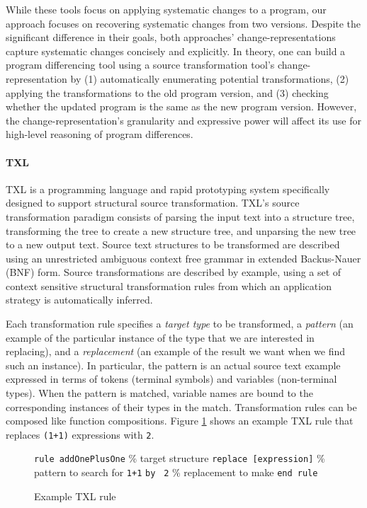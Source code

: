 \documentclass[runningheads,a4paper]{llncs}
\newcommand{\codefont}[1]{\footnotesize{\texttt{#1}}\normalsize}
\begin{document}
While these tools focus on applying systematic changes to a program, our approach focuses on recovering systematic changes from two versions. 
Despite the significant difference in their goals, both approaches' change-representations capture systematic changes concisely and explicitly. In theory, one can build a program differencing tool using a source transformation tool's change-representation by (1) automatically enumerating potential transformations, (2) applying the transformations to the old program version, and (3) checking whether the updated program is the same as the new program version. 
However, the change-representation's granularity and expressive power will affect its use for high-level reasoning of program differences. 

\paragraph{TXL} 

TXL is a programming language and rapid prototyping system specifically designed to support structural source transformation. TXL's source transformation paradigm consists of parsing the input text into a structure tree, transforming the tree to create a new structure tree, and unparsing the new tree to a new output text. Source text structures to be transformed are described using an unrestricted ambiguous context free grammar in extended Backus-Nauer (BNF) form. Source transformations are described by example, using a set of context sensitive structural transformation rules from which an application strategy is automatically inferred. 

Each transformation rule specifies a {\em target type} to be transformed, a {\em pattern} (an example of the particular instance of the type that we are interested in replacing), and a {\em replacement} (an example of the result we want when we find such an instance). In particular, the pattern is an actual source text example expressed in terms of tokens (terminal symbols) and variables (non-terminal types). When the pattern is matched, variable names are bound to the corresponding instances of their types in the match. Transformation rules can be composed like function compositions.  Figure \ref{txl_rule} shows an example TXL rule that replaces \codefont{(1+1)} expressions with \codefont{2}. 

\begin{figure} 
\codefont{rule addOnePlusOne} \% target structure \newline
\indent \codefont{replace [expression]}  \% pattern to search for \newline
\indent \indent \codefont{1+1} \newline
\indent \codefont{by } 
\indent \indent \codefont{2} \newline \% replacement to make \newline
\codefont{end rule} \newline
\caption{Example TXL rule} 
\label{txl_rule} 
\end{figure} 
\end{document}
